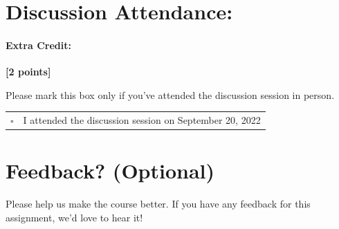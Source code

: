 \documentclass[11pt]{article}
\begin{document}
\pagebreak
\section*{Discussion Attendance:}
\paragraph{Extra Credit:} \textbf{[2 points]}

Please mark this box only if you've attended the discussion session in person.

\begin{tabular}[h]{ll}
$\square$ & I attended the discussion session on September 20, 2022 \\
\end{tabular}


\pagebreak
\section*{Feedback? (Optional)}
Please help us make the course better. If you have any feedback for this assignment, we'd love to hear it!
\end{document}
